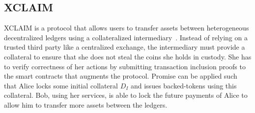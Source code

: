 \documentclass[runningheads]{llncs}
\newcommand{\sys}{Promise\xspace}
\begin{document}


\subsection{XCLAIM}

XCLAIM is a protocol that allows users to transfer assets between heterogeneous decentralized ledgers using a collateralized intermediary~\cite{Zamyatin2019XCLAIM}.
Instead of relying on a trusted third party like a centralized exchange, the intermediary must provide a collateral to ensure that she does not steal the coins she holds in custody.
She has to verify correctness of her actions by submitting transaction inclusion proofs to the smart contracts that augments the protocol.
\sys can be applied such that Alice locks some initial collateral $D_I$ and issues backed-tokens using this collateral.
Bob, using her services, is able to lock the future payments of Alice to allow him to transfer more assets between the ledgers.

\end{document}
